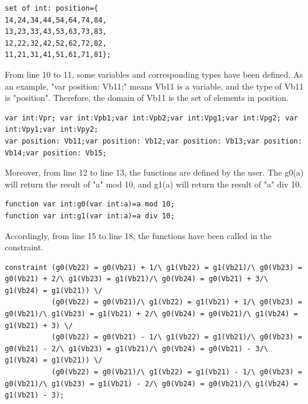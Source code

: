 \begin{lstlisting}[language=minizinc,firstnumber=5]
set of int: position={
14,24,34,44,54,64,74,84,
13,23,33,43,53,63,73,83,
12,22,32,42,52,62,72,82,
11,21,31,41,51,61,71,81};
\end{lstlisting}
From line 10 to 11, some variables and corresponding types have been defined. As an example, "var position: Vb11;" means Vb11 is a variable, and the type of Vb11 is "position". Therefore, the domain of Vb11 is the set of elements in position.
\begin{lstlisting}[language=minizinc,firstnumber=10]
var int:Vpr; var int:Vpb1;var int:Vpb2;var int:Vpg1;var int:Vpg2; var int:Vpy1;var int:Vpy2;
var position: Vb11;var position: Vb12;var position: Vb13;var position: Vb14;var position: Vb15;
\end{lstlisting}
Moreover, from line 12 to line 13, the functions are defined by the user. The g0(a) will return the result of "a" mod 10, and g1(a) will return the result of "a" div 10.
\begin{lstlisting}[language=minizinc,firstnumber=12]
function var int:g0(var int:a)=a mod 10;
function var int:g1(var int:a)=a div 10;
\end{lstlisting}
Accordingly, from line 15 to line 18, the functions have been called in the constraint.
\begin{lstlisting}[language=minizinc,firstnumber=14]
%blue piece2 
constraint (g0(Vb22) = g0(Vb21) + 1/\ g1(Vb22) = g1(Vb21)/\ g0(Vb23) = g0(Vb21) + 2/\ g1(Vb23) = g1(Vb21)/\ g0(Vb24) = g0(Vb21) + 3/\ g1(Vb24) = g1(Vb21)) \/
           (g0(Vb22) = g0(Vb21)/\ g1(Vb22) = g1(Vb21) + 1/\ g0(Vb23) = g0(Vb21)/\ g1(Vb23) = g1(Vb21) + 2/\ g0(Vb24) = g0(Vb21)/\ g1(Vb24) = g1(Vb21) + 3) \/
           (g0(Vb22) = g0(Vb21) - 1/\ g1(Vb22) = g1(Vb21)/\ g0(Vb23) = g0(Vb21) - 2/\ g1(Vb23) = g1(Vb21)/\ g0(Vb24) = g0(Vb21) - 3/\ g1(Vb24) = g1(Vb21)) \/
           (g0(Vb22) = g0(Vb21)/\ g1(Vb22) = g1(Vb21) - 1/\ g0(Vb23) = g0(Vb21)/\ g1(Vb23) = g1(Vb21) - 2/\ g0(Vb24) = g0(Vb21)/\ g1(Vb24) = g1(Vb21) - 3);
\end{lstlisting}


